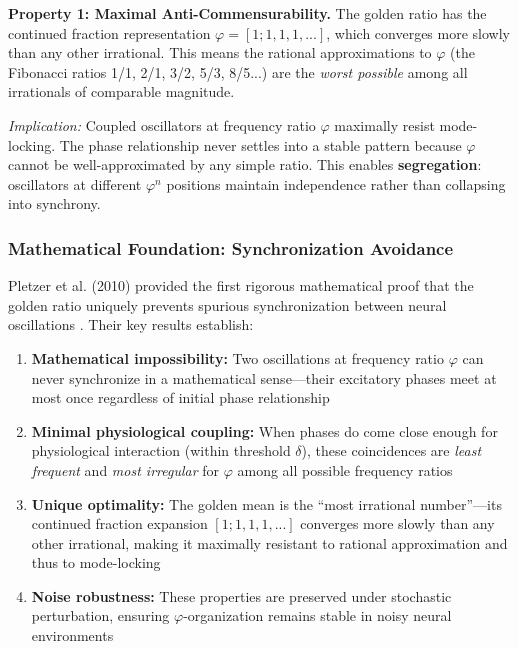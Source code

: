 \documentclass[11pt,a4paper]{article}
\newcommand{\phisym}{\varphi}
\begin{document}
\textbf{Property 1: Maximal Anti-Commensurability.}
The golden ratio has the continued fraction representation $\phisym = [1; 1, 1, 1, ...]$, which converges more slowly than any other irrational. This means the rational approximations to $\phisym$ (the Fibonacci ratios 1/1, 2/1, 3/2, 5/3, 8/5...) are the \textit{worst possible} among all irrationals of comparable magnitude.

\textit{Implication:} Coupled oscillators at frequency ratio $\phisym$ maximally resist mode-locking. The phase relationship never settles into a stable pattern because $\phisym$ cannot be well-approximated by any simple ratio. This enables \textbf{segregation}: oscillators at different $\phisym^n$ positions maintain independence rather than collapsing into synchrony.

\subsubsection{Mathematical Foundation: Synchronization Avoidance}

Pletzer et al. (2010) provided the first rigorous mathematical proof that the golden ratio uniquely prevents spurious synchronization between neural oscillations \parencite{pletzer2010golden}. Their key results establish:

\begin{enumerate}
    \item \textbf{Mathematical impossibility:} Two oscillations at frequency ratio $\phisym$ can never synchronize in a mathematical sense---their excitatory phases meet at most once regardless of initial phase relationship

    \item \textbf{Minimal physiological coupling:} When phases do come close enough for physiological interaction (within threshold $\delta$), these coincidences are \textit{least frequent} and \textit{most irregular} for $\phisym$ among all possible frequency ratios

    \item \textbf{Unique optimality:} The golden mean is the ``most irrational number''---its continued fraction expansion $[1; 1, 1, 1, ...]$ converges more slowly than any other irrational, making it maximally resistant to rational approximation and thus to mode-locking

    \item \textbf{Noise robustness:} These properties are preserved under stochastic perturbation, ensuring $\phisym$-organization remains stable in noisy neural environments
\end{enumerate}
\end{document}
